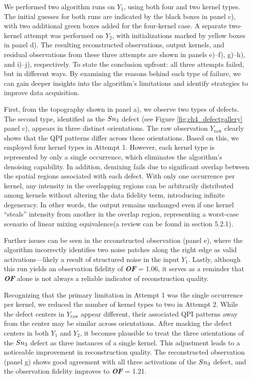 We performed two algorithm runs on $Y_1$, using both four and two kernel types. The initial guesses for both runs are indicated by the black boxes in panel c), with two additional green boxes added for the four-kernel case. A separate two-kernel attempt was performed on $Y_2$, with initializations marked by yellow boxes in panel d). The resulting reconstructed observations, output kernels, and residual observations from these three attempts are shown in panels e)–f), g)–h), and i)–j), respectively. To state the conclusion upfront: all three attempts failed, but in different ways. By examining the reasons behind each type of failure, we can gain deeper insights into the algorithm's limitations and identify strategies to improve data acquisition.

First, from the topography shown in panel a), we observe two types of defects. The second type, identified as the $Sn\textsubscript{3}$ defect (see Figure \ref{fig:ch4_defectgallery} panel c), appears in three distinct orientations. The raw observation $Y_{\text{raw}}$ clearly shows that the QPI patterns differ across these orientations. Based on this, we employed four kernel types in Attempt 1. However, each kernel type is represented by only a single occurrence, which eliminates the algorithm’s denoising capability. In addition, demixing fails due to significant overlap between the spatial regions associated with each defect. With only one occurrence per kernel, any intensity in the overlapping regions can be arbitrarily distributed among kernels without altering the data fidelity term, introducing infinite degeneracy. In other words, the output remains unchanged even if one kernel “steals” intensity from another in the overlap region, representing a worst-case scenario of linear mixing equivalence(a review can be found in section 5.2.1).

Further issues can be seen in the reconstructed observation (panel e), where the algorithm incorrectly identifies two noise patches along the right edge as valid activations—likely a result of structured noise in the input $Y_1$. Lastly, although this run yields an observation fidelity of \textbf{\textit{OF}} = 1.06, it serves as a reminder that \textbf{\textit{OF}} alone is not always a reliable indicator of reconstruction quality.

Recognizing that the primary limitation in Attempt 1 was the single occurrence per kernel, we reduced the number of kernel types to two in Attempt 2. While the defect centers in $Y_{\text{raw}}$ appear different, their associated QPI patterns away from the center may be similar across orientations. After masking the defect centers in both $Y_1$ and $Y_2$, it becomes plausible to treat the three orientations of the $Sn\textsubscript{3}$ defect as three instances of a single kernel. This adjustment leads to a noticeable improvement in reconstruction quality. The reconstructed observation (panel g) shows good agreement with all three activations of the $Sn\textsubscript{3}$ defect, and the observation fidelity improves to \textbf{\textit{OF}} = 1.21.

